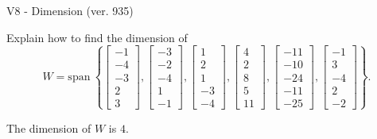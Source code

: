 \begin{exercise}
  \begin{exerciseTitle}V8 - Dimension (ver. 935)\end{exerciseTitle}
  \begin{exerciseStatement}
    Explain how to find the dimension of 
\[W=\mathrm{span}\ \left\{\left[\begin{array}{r}
-1 \\
-4 \\
-3 \\
2 \\
3
\end{array}\right] , \left[\begin{array}{r}
-3 \\
-2 \\
-4 \\
1 \\
-1
\end{array}\right] , \left[\begin{array}{r}
1 \\
2 \\
1 \\
-3 \\
-4
\end{array}\right] , \left[\begin{array}{r}
4 \\
2 \\
8 \\
5 \\
11
\end{array}\right] , \left[\begin{array}{r}
-11 \\
-10 \\
-24 \\
-11 \\
-25
\end{array}\right] , \left[\begin{array}{r}
-1 \\
3 \\
-4 \\
2 \\
-2
\end{array}\right]\right\}.\]



  \end{exerciseStatement}
  \begin{exerciseAnswer}
   The dimension of \(W\) is  \(4\).
  


  \end{exerciseAnswer}
\end{exercise}